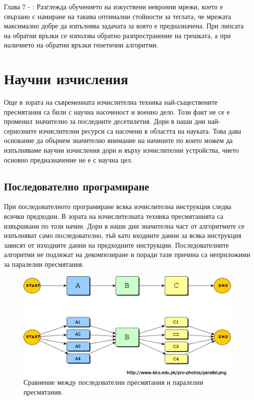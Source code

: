 \documentclass[book,14pt,oneside,openany]{memoir}
\begin{document}
Глава 7 - : Разглежда обучението на изкуствени невронни мрежи, което е свързано с намиране на такива оптимални стойности за теглата, че мрежата максимално добре да изпълнява задачата за която е предназначена. При липсата на обратни връзки се използва обратно разпространение на грешката, а при наличието на обратни връзки генетични алгоритми. 

\newpage
\chapter{Научни изчисления}
\label{chapter01}

Още в зората на съвременната изчислителна техника най-съществените пресмятания са били с научна насоченост и военно дело. Този факт не се е променил значително за последните десетилетия. Дори в наши дни най-сериозните изчислителни ресурси са насочени в областта на науката. Това дава основание да обърнем значително внимание на начините по които можем да изпълняваме научни изчисления дори и върху изчислителни устройства, чието основно предназначение не е с научна цел. 

\section{Последователно програмиране}

При последователното програмиране всяка изчислителна инструкция следва всички предходни. В зората на изчислителната техника пресмятанията са извършвани по този начин. Дори в наши дни значителна част от алгоритмите се изпълняват само последователно, тъй като входните данни за всяка инструкция зависят от изходните данни на предходните инструкции. Последователните алгоритми не подлежат на декомпозиране и поради тази причина са неприложими за паралелни пресмятания. 

\begin{figure}[h]
  \centering
  \includegraphics[width=1.0\linewidth]{pic0001}
  \caption{Сравнение между последователни пресмятания и паралелни пресмятания.}
\label{fig:pic0001}
\end{figure}
\end{document}
